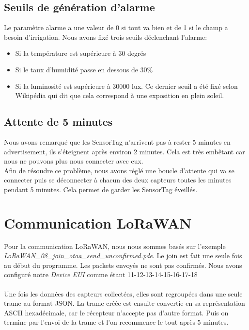 \subsection{Seuils de génération d'alarme}
Le paramètre alarme a une valeur de 0 si tout va bien et de 1 si le champ a besoin d'irrigation. Nous avons fixé trois seuils déclenchant l'alarme:
\begin{itemize}
	\item Si la température est supérieure à 30 degrés
	\item Si le taux d'humidité passe en dessous de 30\%
	\item Si la luminosité est supérieure à 30000 lux. Ce dernier seuil a été fixé selon Wikipédia qui dit que cela correspond à une exposition en plein soleil.
\end{itemize}
\subsection{Attente de 5 minutes}
Nous avons remarqué que les SensorTag n'arrivent pas à rester 5 minutes en advertisement, ils s'éteignent après environ 2 minutes. Cela est très embêtant car nous ne pouvons plus nous connecter avec eux.\\
Afin de résoudre ce problème, nous avons réglé une boucle d'attente qui va se connecter puis se déconnecter à chacun des deux capteurs toutes les minutes pendant 5 minutes. Cela permet de garder les SensorTag éveillés.
\section{Communication LoRaWAN}
Pour la communication LoRaWAN, nous nous sommes basés sur l'exemple \\\textit{LoRaWAN\_08\_join\_otaa\_send\_unconfirmed.pde}. Le join est fait une seule fois au début du programme. Les packets envoyés ne sont pas confirmés. Nous avons configuré notre \textit{Device EUI} comme étant 11-12-13-14-15-16-17-18\\\\
Une fois les données des capteurs collectées, elles sont regroupées dans une seule trame au format JSON. La trame créée est ensuite convertie en sa représentation ASCII hexadécimale, car le récepteur n'accepte pas d'autre format. Puis on termine par l'envoi de la trame et l'on recommence le tout après 5 minutes.
